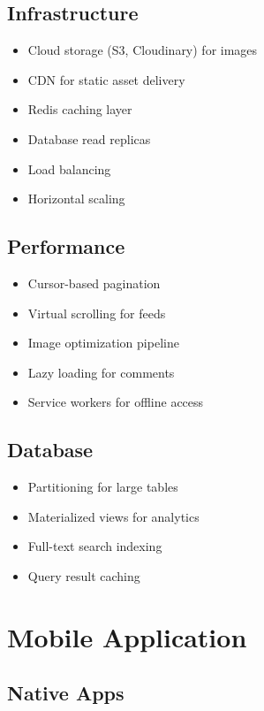 \documentclass[12pt,a4paper]{report}
\begin{document}
\subsection{Infrastructure}

\begin{itemize}
    \item Cloud storage (S3, Cloudinary) for images
    \item CDN for static asset delivery
    \item Redis caching layer
    \item Database read replicas
    \item Load balancing
    \item Horizontal scaling
\end{itemize}

\subsection{Performance}

\begin{itemize}
    \item Cursor-based pagination
    \item Virtual scrolling for feeds
    \item Image optimization pipeline
    \item Lazy loading for comments
    \item Service workers for offline access
\end{itemize}

\subsection{Database}

\begin{itemize}
    \item Partitioning for large tables
    \item Materialized views for analytics
    \item Full-text search indexing
    \item Query result caching
\end{itemize}

\section{Mobile Application}

\subsection{Native Apps}
\end{document}
